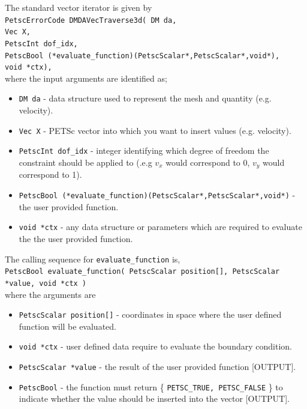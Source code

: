 \documentclass[paper=a4, fontsize=11pt,twoside]{scrartcl}
\newcommand{\shellcmd}[1]{\\\indent\indent\texttt{\hspace{5mm}\footnotesize #1}\\}
\newcommand{\unix}[1]{\texttt{\footnotesize #1}}
\begin{document}
{{The standard vector iterator is given by
\shellcmd{PetscErrorCode DMDAVecTraverse3d( \newline
  DM da, \\
  Vec X, \\
  PetscInt dof\_idx, \\
  PetscBool (*evaluate\_function)(PetscScalar*,PetscScalar*,void*), \\
  void *ctx),} 
 where the input arguments are identified as;
\begin{itemize}
\item[] \unix{DM da} - data structure used to represent the mesh and quantity (e.g. velocity).
\item[] \unix{Vec X} - PETSc vector into which you want to insert values (e.g. velocity).
\item[] \unix{PetscInt dof\_idx} - integer identifying which degree of freedom the constraint should be applied to (.e.g $v_x$ would correspond to 0, $v_y$ would correspond to 1).
\item[] \unix{PetscBool (*evaluate\_function)(PetscScalar*,PetscScalar*,void*)} - the user provided function.
\item[] \unix{void *ctx} - any data structure or parameters which are required to evaluate the the user provided function.
\end{itemize}
The calling sequence for \unix{evaluate\_function} is,
\shellcmd{PetscBool evaluate\_function( PetscScalar position[], PetscScalar *value, void *ctx )}
where the arguments are
\begin{itemize}
\item[] \unix{PetscScalar position[]} - coordinates in space where the user defined function will be evaluated.
\item[] \unix{void *ctx} - user defined data require to evaluate the boundary condition.
\item[] \unix{PetscScalar *value} - the result of the user provided function [OUTPUT].
\item[] \unix{PetscBool} - the function must return \{ \unix{PETSC\_TRUE, PETSC\_FALSE} \} to indicate whether the value should be inserted into the vector [OUTPUT].
\end{itemize}
%
%
%
%

}}
\end{document}
